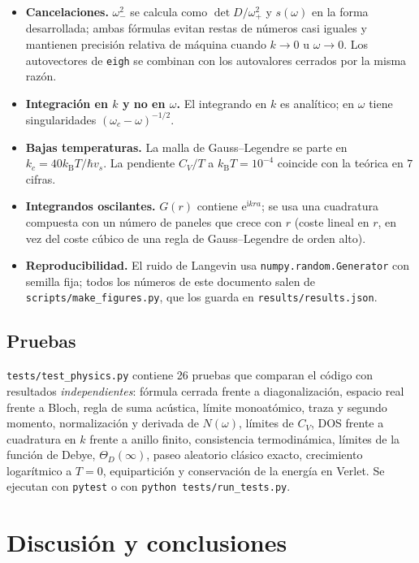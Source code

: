 \documentclass[11pt,a4paper]{article}
\newcommand{\kB}{k_{\mathrm B}}
\newcommand{\ii}{\mathrm{i}}
\newcommand{\ee}{\mathrm{e}}
\newcommand{\vs}{v_{s}}
\newcommand{\code}[1]{\texttt{#1}}
\begin{document}
\begin{itemize}
\item \textbf{Cancelaciones.} $\omega_-^2$ se calcula como $\det D/\omega_+^2$ y
  $s(\omega)$ en la forma desarrollada; ambas fórmulas evitan restas de números
  casi iguales y mantienen precisión relativa de máquina cuando $k\to0$ u
  $\omega\to0$. Los autovectores de \code{eigh} se combinan con los autovalores
  cerrados por la misma razón.
\item \textbf{Integración en $k$ y no en $\omega$.} El integrando en $k$ es
  analítico; en $\omega$ tiene singularidades $(\omega_c-\omega)^{-1/2}$.
\item \textbf{Bajas temperaturas.} La malla de Gauss–Legendre se parte en
  $k_c=40\kB T/\hbar\vs$. La pendiente $C_V/T$ a $\kB T=10^{-4}$ coincide con la
  teórica en $7$ cifras.
\item \textbf{Integrandos oscilantes.} $G(r)$ contiene $\ee^{\ii kra}$; se usa una
  cuadratura compuesta con un número de paneles que crece con $r$ (coste lineal
  en $r$, en vez del coste cúbico de una regla de Gauss–Legendre de orden alto).
\item \textbf{Reproducibilidad.} El ruido de Langevin usa
  \code{numpy.random.Generator} con semilla fija; todos los números de este
  documento salen de \code{scripts/make\_figures.py}, que los guarda en
  \code{results/results.json}.
\end{itemize}

\subsection{Pruebas}

\code{tests/test\_physics.py} contiene 26 pruebas que comparan el código con
resultados \emph{independientes}: fórmula cerrada frente a diagonalización,
espacio real frente a Bloch, regla de suma acústica, límite monoatómico, traza
y segundo momento, normalización y derivada de $N(\omega)$, límites de $C_V$,
DOS frente a cuadratura en $k$ frente a anillo finito, consistencia
termodinámica, límites de la función de Debye, $\Theta_D(\infty)$, paseo
aleatorio clásico exacto, crecimiento logarítmico a $T=0$, equipartición y
conservación de la energía en Verlet. Se ejecutan con \code{pytest} o con
\code{python tests/run\_tests.py}.

\section{Discusión y conclusiones}
\end{document}
